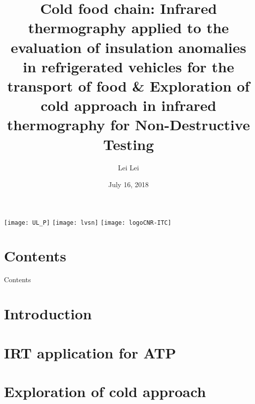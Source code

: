 \documentclass{beamer}
\title[Cold food chain-IRT application]{Cold food chain: Infrared thermography applied to the evaluation of insulation anomalies in refrigerated vehicles for the transport of food \& Exploration of cold approach in infrared thermography for Non-Destructive Testing}
\author[Lei Lei]{Lei Lei}
\institute[Université Laval]
{
	Electrical and Computer Engineering Department \\
	Laval University, Quebec City, Canada \\
	\medskip
}
\date{July 16, 2018} %
\begin{document}
\begin{frame}[label=titre, plain]
	\titlepage
	\begin{center}
		\texttt{[image: UL\_P]}%
		\hspace{1cm}
		\texttt{[image: lvsn]}
		\hspace{1cm}
		\texttt{[image: logoCNR-ITC]}
	\end{center}
\end{frame}


\section*{Contents}

\begin{frame}[label=toc]{Contents}
	\setlength{\leftskip}{5cm}%
	\tableofcontents[subsubsectionstyle=hide]
\end{frame}


\section{Introduction}


\section{IRT application for ATP}




\section{Exploration of cold approach}






\end{document}

